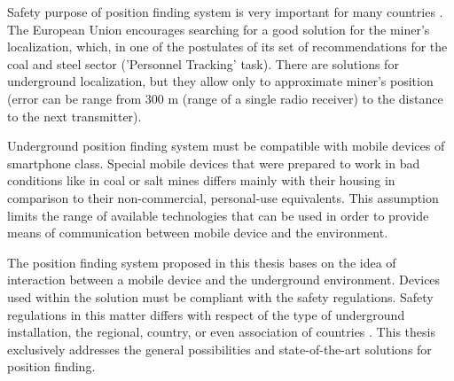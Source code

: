 \documentclass[../main.tex]{subfiles}
\begin{document}
Safety purpose of position finding system is very important for many countries \cite{positioning_tests}. The European Union encourages searching for a good solution for the miner's localization, which, in one of the postulates of its set of recommendations for the coal and steel sector ('Personnel Tracking' task). There are solutions for underground localization, but they allow only to approximate miner's position (error can be range from 300 m (range of a single radio receiver) to the distance to the next transmitter).

Underground position finding system must be compatible with mobile devices of smartphone class. Special mobile devices that were prepared to work in bad conditions like in coal or salt mines differs mainly with their housing in comparison to their non-commercial, personal-use equivalents. This assumption limits the range of available technologies that can be used in order to provide means of communication between mobile device and the environment.

The position finding system proposed in this thesis bases on the idea of interaction between a mobile device and the underground environment. Devices used within the solution must be compliant with the safety regulations. Safety regulations in this matter differs with respect of the type of underground installation, the regional, country, or even association of countries \cite{Thesis_CM}. This thesis exclusively addresses the general possibilities and state-of-the-art solutions for position finding.
\end{document}
